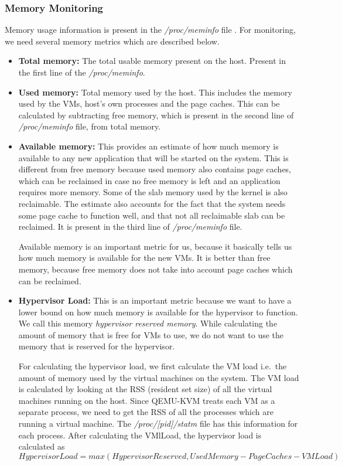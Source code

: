 \subsubsection{Memory Monitoring} \label{impl:hostmemmon}
Memory usage information is present in the \textit{/proc/meminfo} file \cite{procfs}. For monitoring, we need several memory metrics which are described below.
\begin{itemize}
\item \textbf{Total memory:} The total usable memory present on the host. Present in the first line of the \textit{/proc/meminfo}.
\item \textbf{Used memory:} Total memory used by the host. This includes the memory used by the VMs, host's own processes and the page caches. This can be calculated by subtracting free memory, which is present in the second line of \textit{/proc/meminfo} file, from total memory.
\item \textbf{Available memory:} This provides an estimate of how much memory is available to any new application that will be started on the system. This is different from free memory because used memory also contains page caches, which can be reclaimed in case no free memory is left and an application requires more memory. Some of the slab memory used by the kernel is also reclaimable. The estimate also accounts for the fact that the system needs some page cache to function well, and that not all reclaimable slab can be reclaimed. It is present in the third line of \textit{/proc/meminfo} file.

Available memory is an important metric for us, because it basically tells us how much memory is available for the new VMs. It is better than free memory, because free memory does not take into account page caches which can be reclaimed.

\item \textbf{Hypervisor Load:} This is an important metric because we want to have a lower bound on how much memory is available for the hypervisor to function. We call this memory \textit{hypervisor reserved memory}. While calculating the amount of memory that is free for VMs to use, we do not want to use the memory that is reserved for the hypervisor.

For calculating the hypervisor load, we first calculate the VM load i.e.\ the amount of memory used by the virtual machines on the system. The VM load is calculated by looking at the RSS (resident set size) of all the virtual machines running on the host. Since QEMU-KVM treats each VM as a separate process, we need to get the RSS of all the processes which are running a virtual machine. The \textit{/proc/[pid]/statm} file has this information for each process. After calculating the VMlLoad, the hypervisor load is calculated as
$$Hypervisor Load = max(Hypervisor Reserved, Used Memory - Page Caches - VMLoad)$$


\end{itemize}
